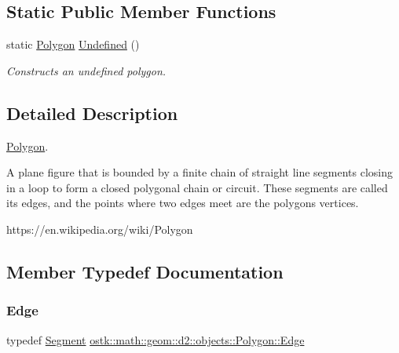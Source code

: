 \subsection*{Static Public Member Functions}
\begin{DoxyCompactItemize}
\item 
static \hyperlink{classostk_1_1math_1_1geom_1_1d2_1_1objects_1_1_polygon}{Polygon} \hyperlink{classostk_1_1math_1_1geom_1_1d2_1_1objects_1_1_polygon_af260e109c9315fd31f7f24f3154dcbf2}{Undefined} ()
\begin{DoxyCompactList}\small\item\em Constructs an undefined polygon. \end{DoxyCompactList}\end{DoxyCompactItemize}


\subsection{Detailed Description}
\hyperlink{classostk_1_1math_1_1geom_1_1d2_1_1objects_1_1_polygon}{Polygon}. 

A plane figure that is bounded by a finite chain of straight line segments closing in a loop to form a closed polygonal chain or circuit. These segments are called its edges, and the points where two edges meet are the polygon\textquotesingle{}s vertices.

https\+://en.wikipedia.\+org/wiki/\+Polygon 

\subsection{Member Typedef Documentation}
\mbox{\label{classostk_1_1math_1_1geom_1_1d2_1_1objects_1_1_polygon_a85e5c92944c126a62464874b5a6ba490}} 
\subsubsection{\texorpdfstring{Edge}{Edge}}
{\footnotesize\ttfamily typedef \hyperlink{classostk_1_1math_1_1geom_1_1d2_1_1objects_1_1_segment}{Segment} \hyperlink{classostk_1_1math_1_1geom_1_1d2_1_1objects_1_1_polygon_a85e5c92944c126a62464874b5a6ba490}{ostk\+::math\+::geom\+::d2\+::objects\+::\+Polygon\+::\+Edge}}


